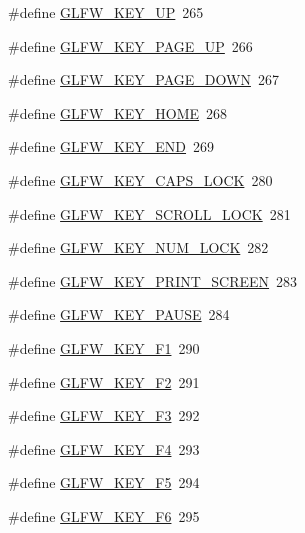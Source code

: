 \begin{DoxyCompactItemize}
\#define \hyperlink{group__keys_ga2f3342b194020d3544c67e3506b6f144}{G\-L\-F\-W\-\_\-\-K\-E\-Y\-\_\-\-U\-P}~265
\item 
\#define \hyperlink{group__keys_ga3ab731f9622f0db280178a5f3cc6d586}{G\-L\-F\-W\-\_\-\-K\-E\-Y\-\_\-\-P\-A\-G\-E\-\_\-\-U\-P}~266
\item 
\#define \hyperlink{group__keys_gaee0a8fa442001cc2147812f84b59041c}{G\-L\-F\-W\-\_\-\-K\-E\-Y\-\_\-\-P\-A\-G\-E\-\_\-\-D\-O\-W\-N}~267
\item 
\#define \hyperlink{group__keys_ga41452c7287195d481e43207318c126a7}{G\-L\-F\-W\-\_\-\-K\-E\-Y\-\_\-\-H\-O\-M\-E}~268
\item 
\#define \hyperlink{group__keys_ga86587ea1df19a65978d3e3b8439bedd9}{G\-L\-F\-W\-\_\-\-K\-E\-Y\-\_\-\-E\-N\-D}~269
\item 
\#define \hyperlink{group__keys_ga92c1d2c9d63485f3d70f94f688d48672}{G\-L\-F\-W\-\_\-\-K\-E\-Y\-\_\-\-C\-A\-P\-S\-\_\-\-L\-O\-C\-K}~280
\item 
\#define \hyperlink{group__keys_gaf622b63b9537f7084c2ab649b8365630}{G\-L\-F\-W\-\_\-\-K\-E\-Y\-\_\-\-S\-C\-R\-O\-L\-L\-\_\-\-L\-O\-C\-K}~281
\item 
\#define \hyperlink{group__keys_ga3946edc362aeff213b2be6304296cf43}{G\-L\-F\-W\-\_\-\-K\-E\-Y\-\_\-\-N\-U\-M\-\_\-\-L\-O\-C\-K}~282
\item 
\#define \hyperlink{group__keys_gaf964c2e65e97d0cf785a5636ee8df642}{G\-L\-F\-W\-\_\-\-K\-E\-Y\-\_\-\-P\-R\-I\-N\-T\-\_\-\-S\-C\-R\-E\-E\-N}~283
\item 
\#define \hyperlink{group__keys_ga8116b9692d87382afb5849b6d8907f18}{G\-L\-F\-W\-\_\-\-K\-E\-Y\-\_\-\-P\-A\-U\-S\-E}~284
\item 
\#define \hyperlink{group__keys_gafb8d66c573acf22e364049477dcbea30}{G\-L\-F\-W\-\_\-\-K\-E\-Y\-\_\-\-F1}~290
\item 
\#define \hyperlink{group__keys_ga0900750aff94889b940f5e428c07daee}{G\-L\-F\-W\-\_\-\-K\-E\-Y\-\_\-\-F2}~291
\item 
\#define \hyperlink{group__keys_gaed7cd729c0147a551bb8b7bb36c17015}{G\-L\-F\-W\-\_\-\-K\-E\-Y\-\_\-\-F3}~292
\item 
\#define \hyperlink{group__keys_ga9b61ebd0c63b44b7332fda2c9763eaa6}{G\-L\-F\-W\-\_\-\-K\-E\-Y\-\_\-\-F4}~293
\item 
\#define \hyperlink{group__keys_gaf258dda9947daa428377938ed577c8c2}{G\-L\-F\-W\-\_\-\-K\-E\-Y\-\_\-\-F5}~294
\item 
\#define \hyperlink{group__keys_ga6dc2d3f87b9d51ffbbbe2ef0299d8e1d}{G\-L\-F\-W\-\_\-\-K\-E\-Y\-\_\-\-F6}~295

\end{DoxyCompactItemize}

